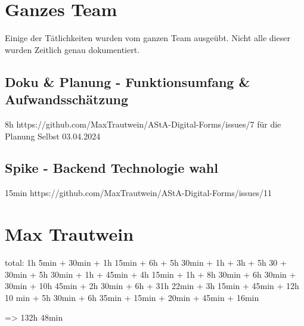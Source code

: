\section{Ganzes Team}
Einige der Tätlichkeiten wurden vom ganzen Team ausgeübt.
Nicht alle dieser wurden Zeitlich genau dokumentiert.

\subsection{Doku & Planung - Funktionsumfang & Aufwandsschätzung}
8h
https://github.com/MaxTrautwein/AStA-Digital-Forms/issues/7
für die Planung Selbst
03.04.2024

\subsection{Spike - Backend Technologie wahl }
15min
https://github.com/MaxTrautwein/AStA-Digital-Forms/issues/11

\section{Max Trautwein}\label{sec:max-trautwein}

total: 1h 5min + 30min + 1h 15min + 6h + 5h 30min + 1h + 3h + 5h 30 + 30min + 5h 30min + 1h + 45min + 4h 15min + 1h
+ 8h 30min + 6h 30min + 30min + 10h 45min + 2h 30min + 6h + 31h 22min + 3h 15min + 45min + 12h 10 min + 5h 30min + 6h 35min
+ 15min + 20min + 45min + 16min

=> 132h 48min

